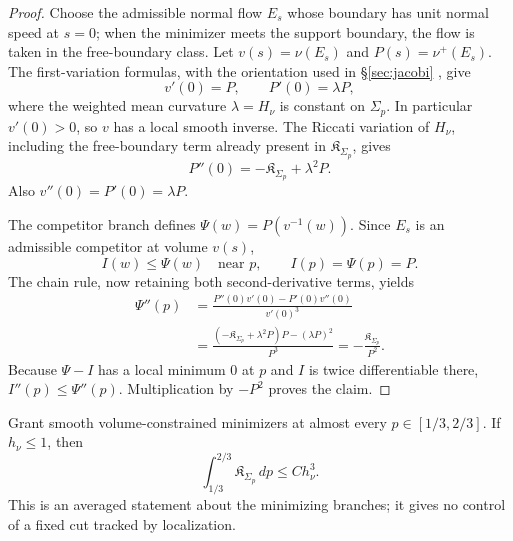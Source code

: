 \documentclass[../main.tex]{subfiles}
\begin{document}
\begin{proof}
Choose the admissible normal flow $E_s$ whose boundary has unit normal speed at $s=0$; when the
minimizer meets the support boundary, the flow is taken in the free-boundary class.  Let
$v(s)=\nu(E_s)$ and $P(s)=\nu^+(E_s)$.  The first-variation formulas, with the orientation used
in \S\ref{sec:jacobi} \cite{Bayle2004,BayleRosales2003,Rosales2014,Milman2009Isoperimetric},
give
\[
  v'(0)=P,\qquad P'(0)=\lambda P,
\]
where the weighted mean curvature $\lambda=H_\nu$ is constant on $\Sigma_p$.  In particular
$v'(0)>0$, so $v$ has a local smooth inverse.  The Riccati variation of $H_\nu$, including the
free-boundary term already present in $\mathfrak K_{\Sigma_p}$, gives
\[
  P''(0)=-\mathfrak K_{\Sigma_p}+\lambda^2P.
\]
Also $v''(0)=P'(0)=\lambda P$.

The competitor branch defines $\Psi(w)=P(v^{-1}(w))$.  Since $E_s$ is an admissible competitor
at volume $v(s)$,
\[
  I(w)\le\Psi(w)\quad\text{near }p,
  \qquad I(p)=\Psi(p)=P.
\]
The chain rule, now retaining both second-derivative terms, yields
\begin{align*}
  \Psi''(p)
  &=\frac{P''(0)v'(0)-P'(0)v''(0)}{v'(0)^3}\\
  &=\frac{(-\mathfrak K_{\Sigma_p}+\lambda^2P)P-(\lambda P)^2}{P^3}
    =-\frac{\mathfrak K_{\Sigma_p}}{P^2}.
\end{align*}
Because $\Psi-I$ has a local minimum $0$ at $p$ and $I$ is twice differentiable there,
$I''(p)\le\Psi''(p)$.  Multiplication by $-P^2$ proves the claim.
\end{proof}

\begin{corollary}[= Corollary~\ref{cor:generic-degeneracy}]
\label{cor:sol-generic-degeneracy}
Grant smooth volume-constrained minimizers at almost every $p\in[1/3,2/3]$.  If $h_\nu\le1$,
then
\[
  \int_{1/3}^{2/3}\mathfrak K_{\Sigma_p}\,dp\le C h_\nu^3.
\]
This is an averaged statement about the minimizing branches; it gives no control of a fixed cut
tracked by localization.
\end{corollary}
\end{document}
